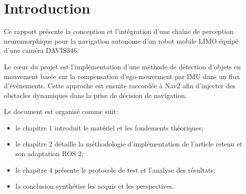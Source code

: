 \chapter*{Introduction}

Ce rapport présente la conception et l'intégration d'une chaîne de perception
neuromorphique pour la navigation autonome d'un robot mobile LIMO équipé d'une
caméra DAVIS346.

Le cœur du projet est l'implémentation d'une méthode de détection d'objets en
mouvement basée sur la compensation d'ego-mouvement par IMU dans un flux
d'événements. Cette approche est ensuite raccordée à Nav2 afin d'injecter des
obstacles dynamiques dans la prise de décision de navigation.

Le document est organisé comme suit:
\begin{itemize}
\item le chapitre 1 introduit le matériel et les fondements théoriques;
\item le chapitre 2 détaille la méthodologie d'implémentation de l'article
retenu et son adaptation ROS 2;
\item le chapitre 4 présente le protocole de test et l'analyse des résultats;
\item la conclusion synthétise les acquis et les perspectives.
\end{itemize}
